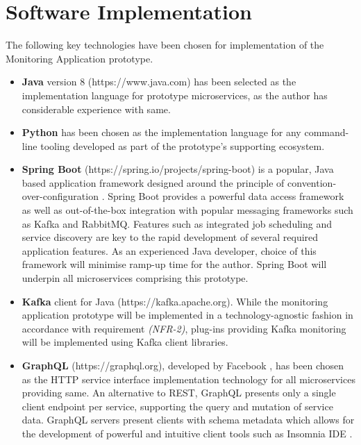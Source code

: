 \chapter{Software Implementation}

The following key technologies have been chosen for implementation of the Monitoring Application prototype.

\begin{itemize}
	
	\item \textbf{Java} version 8 (https://www.java.com) has been selected as the implementation language for prototype microservices, as the author has considerable experience with same.
	
	\item \textbf{Python} has been chosen as the implementation language for any command-line tooling developed as part of the prototype's supporting ecosystem.
		
	\item \textbf{Spring Boot} (https://spring.io/projects/spring-boot) is a popular, Java based application framework designed around the principle of convention-over-configuration \cite{Conventi95:online}. Spring Boot provides a powerful data access framework as well as out-of-the-box integration with popular messaging frameworks such as Kafka and RabbitMQ. Features such as integrated job scheduling and service discovery are key to the rapid development of several required application features. As an experienced Java developer, choice of this framework will minimise ramp-up time for the author. Spring Boot will underpin all microservices comprising this prototype.
	
	\item \textbf{Kafka} client for Java (https://kafka.apache.org). While the monitoring application prototype will be implemented in a technology-agnostic fashion in accordance with requirement  \textit{(NFR-2)}, plug-ins providing Kafka monitoring will be implemented using Kafka client libraries.
		
	\item \textbf{GraphQL} (https://graphql.org), developed by Facebook \cite{GraphQLA36:online}, has been chosen as the HTTP service interface implementation technology for all microservices providing same. An alternative to REST, GraphQL presents only a single client endpoint per service, supporting the query and mutation of service data. GraphQL servers present clients with schema metadata which allows for the development of powerful and intuitive client tools such as Insomnia IDE \cite{GraphQLI51:online}.
	

\end{itemize}

